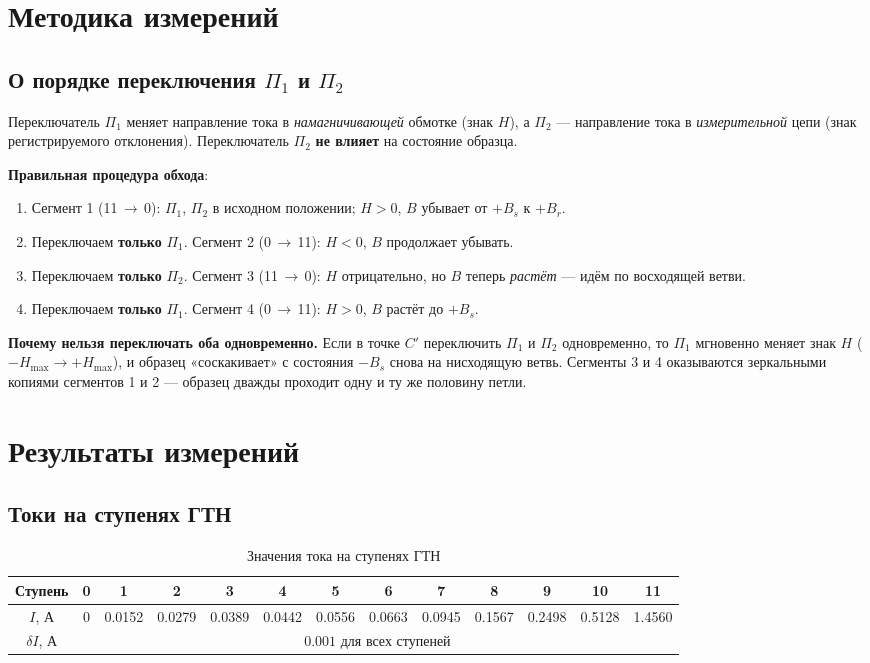 \documentclass[a4paper]{article}
\begin{document}
	\section{Методика измерений}
	
	\subsection{О порядке переключения $\Pi_1$ и $\Pi_2$}
	
	Переключатель $\Pi_1$ меняет направление тока в \emph{намагничивающей} обмотке (знак $H$), а $\Pi_2$ — направление тока в \emph{измерительной} цепи (знак регистрируемого отклонения). Переключатель $\Pi_2$ \textbf{не влияет} на состояние образца.
	
	\textbf{Правильная процедура обхода}:
	\begin{enumerate}
		\item Сегмент 1 (11\,$\to$\,0): $\Pi_1$, $\Pi_2$ в исходном положении; $H > 0$, $B$ убывает от $+B_s$ к $+B_r$.
		\item Переключаем \textbf{только} $\Pi_1$. Сегмент 2 (0\,$\to$\,11): $H < 0$, $B$ продолжает убывать.
		\item Переключаем \textbf{только} $\Pi_2$. Сегмент 3 (11\,$\to$\,0): $H$ отрицательно, но $B$ теперь \emph{растёт} — идём по восходящей ветви.
		\item Переключаем \textbf{только} $\Pi_1$. Сегмент 4 (0\,$\to$\,11): $H > 0$, $B$ растёт до $+B_s$.
	\end{enumerate}
	
	\textbf{Почему нельзя переключать оба одновременно.} Если в точке $C'$ переключить $\Pi_1$ и $\Pi_2$ одновременно, то $\Pi_1$ мгновенно меняет знак $H$ ($-H_{\max} \to +H_{\max}$), и образец «соскакивает» с состояния $-B_s$ снова на нисходящую ветвь. Сегменты 3 и 4 оказываются зеркальными копиями сегментов 1 и 2 — образец дважды проходит одну и ту же половину петли.
	
	\section{Результаты измерений}
	
	\subsection{Токи на ступенях ГТН}
	
	\begin{table}[h]
		\centering
		\caption{Значения тока на ступенях ГТН}
		\label{tab:currents}
		\begin{tabular}{|c|c|c|c|c|c|c|c|c|c|c|c|c|}
			\hline
			Ступень & 0 & 1 & 2 & 3 & 4 & 5 & 6 & 7 & 8 & 9 & 10 & 11 \\
			\hline
			$I$, А & 0 & 0.0152 & 0.0279 & 0.0389 & 0.0442 & 0.0556 & 0.0663 & 0.0945 & 0.1567 & 0.2498 & 0.5128 & 1.4560 \\
			\hline
			$\delta I$, А & \multicolumn{12}{c|}{$0.001$ для всех ступеней} \\
			\hline
		\end{tabular}
	\end{table}
	
\end{document}
